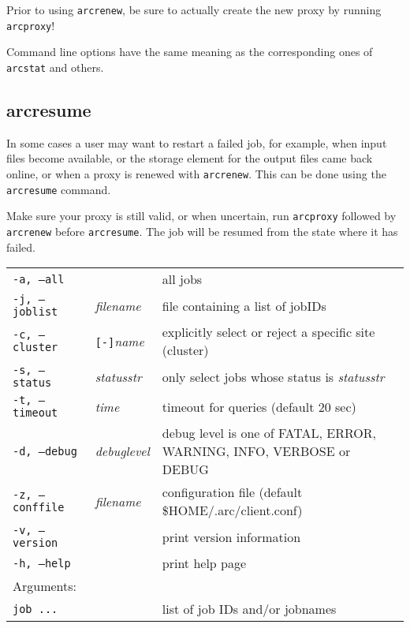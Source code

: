 \begin{framed}
 Prior to using \texttt{arcrenew}, be sure to actually create the
new proxy by running \verb#arcproxy#!
\end{framed}

Command line options have the same meaning as the corresponding ones of \verb#arcstat# and others.


\subsection{arcresume}
\label{sec:arcresume}

In some cases a user may want to restart a failed job, for example, when input
files become available, or the storage element for the output files came back
online, or when a proxy is renewed with \texttt{arcrenew}. This can be done using
the \texttt{arcresume} command.

\begin{framed}
Make sure your proxy is still valid, or when uncertain, run \verb#arcproxy# followed by 
\verb#arcrenew# before \verb#arcresume#. The job will be resumed from the state where it has failed.
\end{framed}

\hspace*{0.5cm}
\begin{shaded}
\end{shaded}
\begin{longtable}{llp{8cm}}
   \texttt{-a, --all}& & all jobs\\
   \texttt{-j, --joblist}& \textit{filename} & file containing a list of jobIDs\\
   \texttt{-c, --cluster}&\verb#[-]#\textit{name}&explicitly select or reject a specific site (cluster)\\
   \texttt{-s, --status}& \textit{statusstr} &only select jobs whose status is \textit{statusstr}\\
   \texttt{-t, --timeout}& \textit{time} & timeout for queries (default 20 sec)\\
   \texttt{-d, --debug}& \textit{debuglevel}&debug level is one of  FATAL, ERROR, WARNING, INFO, VERBOSE or DEBUG\\
   \texttt{-z, --conffile}&\textit{filename}& configuration file (default {\$}HOME/.arc/client.conf)\\
   \texttt{-v, --version}& & print version information\\
   \texttt{-h, --help}& & print help page\\
   Arguments:&&\\
   \texttt{job ...} && list of job IDs and/or jobnames\\
\end{longtable}

